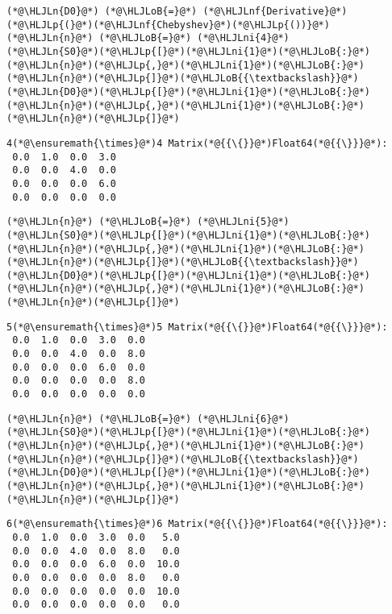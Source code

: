 \documentclass[12pt,a4paper]{article}
\newcommand{\HLJLn}[1]{#1}
\newcommand{\HLJLnf}[1]{\textcolor[RGB]{66,102,213}{#1}}
\newcommand{\HLJLni}[1]{\textcolor[RGB]{59,151,46}{#1}}
\newcommand{\HLJLoB}[1]{\textcolor[RGB]{102,102,102}{\textbf{#1}}}
\newcommand{\HLJLp}[1]{#1}
\begin{document}
\begin{lstlisting}
(*@\HLJLn{D0}@*) (*@\HLJLoB{=}@*) (*@\HLJLnf{Derivative}@*)(*@\HLJLp{(}@*)(*@\HLJLnf{Chebyshev}@*)(*@\HLJLp{())}@*)
(*@\HLJLn{n}@*) (*@\HLJLoB{=}@*) (*@\HLJLni{4}@*)
(*@\HLJLn{S0}@*)(*@\HLJLp{[}@*)(*@\HLJLni{1}@*)(*@\HLJLoB{:}@*)(*@\HLJLn{n}@*)(*@\HLJLp{,}@*)(*@\HLJLni{1}@*)(*@\HLJLoB{:}@*)(*@\HLJLn{n}@*)(*@\HLJLp{]}@*)(*@\HLJLoB{{\textbackslash}}@*)(*@\HLJLn{D0}@*)(*@\HLJLp{[}@*)(*@\HLJLni{1}@*)(*@\HLJLoB{:}@*)(*@\HLJLn{n}@*)(*@\HLJLp{,}@*)(*@\HLJLni{1}@*)(*@\HLJLoB{:}@*)(*@\HLJLn{n}@*)(*@\HLJLp{]}@*)
\end{lstlisting}

\begin{lstlisting}
4(*@\ensuremath{\times}@*)4 Matrix(*@{{\{}}@*)Float64(*@{{\}}}@*):
 0.0  1.0  0.0  3.0
 0.0  0.0  4.0  0.0
 0.0  0.0  0.0  6.0
 0.0  0.0  0.0  0.0
\end{lstlisting}


\begin{lstlisting}
(*@\HLJLn{n}@*) (*@\HLJLoB{=}@*) (*@\HLJLni{5}@*)
(*@\HLJLn{S0}@*)(*@\HLJLp{[}@*)(*@\HLJLni{1}@*)(*@\HLJLoB{:}@*)(*@\HLJLn{n}@*)(*@\HLJLp{,}@*)(*@\HLJLni{1}@*)(*@\HLJLoB{:}@*)(*@\HLJLn{n}@*)(*@\HLJLp{]}@*)(*@\HLJLoB{{\textbackslash}}@*)(*@\HLJLn{D0}@*)(*@\HLJLp{[}@*)(*@\HLJLni{1}@*)(*@\HLJLoB{:}@*)(*@\HLJLn{n}@*)(*@\HLJLp{,}@*)(*@\HLJLni{1}@*)(*@\HLJLoB{:}@*)(*@\HLJLn{n}@*)(*@\HLJLp{]}@*)
\end{lstlisting}

\begin{lstlisting}
5(*@\ensuremath{\times}@*)5 Matrix(*@{{\{}}@*)Float64(*@{{\}}}@*):
 0.0  1.0  0.0  3.0  0.0
 0.0  0.0  4.0  0.0  8.0
 0.0  0.0  0.0  6.0  0.0
 0.0  0.0  0.0  0.0  8.0
 0.0  0.0  0.0  0.0  0.0
\end{lstlisting}


\begin{lstlisting}
(*@\HLJLn{n}@*) (*@\HLJLoB{=}@*) (*@\HLJLni{6}@*)
(*@\HLJLn{S0}@*)(*@\HLJLp{[}@*)(*@\HLJLni{1}@*)(*@\HLJLoB{:}@*)(*@\HLJLn{n}@*)(*@\HLJLp{,}@*)(*@\HLJLni{1}@*)(*@\HLJLoB{:}@*)(*@\HLJLn{n}@*)(*@\HLJLp{]}@*)(*@\HLJLoB{{\textbackslash}}@*)(*@\HLJLn{D0}@*)(*@\HLJLp{[}@*)(*@\HLJLni{1}@*)(*@\HLJLoB{:}@*)(*@\HLJLn{n}@*)(*@\HLJLp{,}@*)(*@\HLJLni{1}@*)(*@\HLJLoB{:}@*)(*@\HLJLn{n}@*)(*@\HLJLp{]}@*)
\end{lstlisting}

\begin{lstlisting}
6(*@\ensuremath{\times}@*)6 Matrix(*@{{\{}}@*)Float64(*@{{\}}}@*):
 0.0  1.0  0.0  3.0  0.0   5.0
 0.0  0.0  4.0  0.0  8.0   0.0
 0.0  0.0  0.0  6.0  0.0  10.0
 0.0  0.0  0.0  0.0  8.0   0.0
 0.0  0.0  0.0  0.0  0.0  10.0
 0.0  0.0  0.0  0.0  0.0   0.0
\end{lstlisting}
\end{document}
